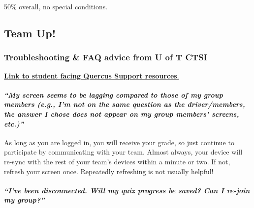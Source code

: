 \documentclass[
  openany]{book}
\begin{document}
50\% overall, no special conditions.

\hypertarget{team-up-1}{%
\subsection{Team Up!}\label{team-up-1}}

\hypertarget{troubleshooting-faq-advice-from-u-of-t-ctsi}{%
\subsubsection{Troubleshooting \& FAQ advice from U of T CTSI}\label{troubleshooting-faq-advice-from-u-of-t-ctsi}}

\href{https://q.utoronto.ca/courses/46670/pages/integration-team-up-for-students}{\textbf{Link to student facing Quercus Support resources}.}

\hypertarget{my-screen-seems-to-be-lagging-compared-to-those-of-my-group-members-e.g.-im-not-on-the-same-question-as-the-drivermembers-the-answer-i-chose-does-not-appear-on-my-group-members-screens-etc.}{%
\paragraph{\texorpdfstring{\emph{``My screen seems to be lagging compared to those of my group members (e.g., I'm not on the same question as the driver/members, the answer I chose does not appear on my group members' screens, etc.)''}}{``My screen seems to be lagging compared to those of my group members (e.g., I'm not on the same question as the driver/members, the answer I chose does not appear on my group members' screens, etc.)''}}\label{my-screen-seems-to-be-lagging-compared-to-those-of-my-group-members-e.g.-im-not-on-the-same-question-as-the-drivermembers-the-answer-i-chose-does-not-appear-on-my-group-members-screens-etc.}}

As long as you are logged in, you will receive your grade, so just continue to participate by communicating with your team. Almost always, your device will re-sync with the rest of your team's devices within a minute or two. If not, refresh your screen once. Repeatedly refreshing is not usually helpful!

\hypertarget{ive-been-disconnected.-will-my-quiz-progress-be-saved-can-i-re-join-my-group}{%
\paragraph{\texorpdfstring{\emph{``I've been disconnected. Will my quiz progress be saved? Can I re-join my group?''}}{``I've been disconnected. Will my quiz progress be saved? Can I re-join my group?''}}\label{ive-been-disconnected.-will-my-quiz-progress-be-saved-can-i-re-join-my-group}}
\end{document}
